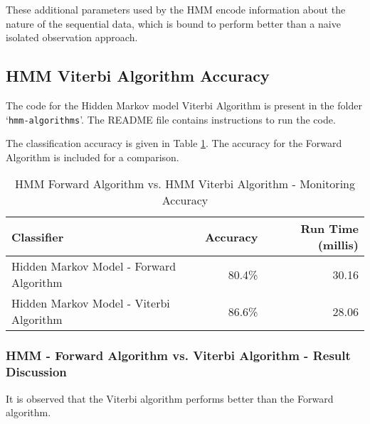 \documentclass[parskip=half]{scrartcl}
\begin{document}
            These additional parameters used by the HMM encode information about the nature of the sequential data, which is bound to perform better than a naive isolated observation approach.
        



    \subsection{HMM Viterbi Algorithm Accuracy} %
    \label{sub:hmm_viterbi_algorithm_accuracy}

        The code for the Hidden Markov model Viterbi Algorithm is present in the folder `\texttt{hmm-algorithms}'. The README file contains instructions to run the code.

        The classification accuracy is given in Table \ref{tab:hmm-forward-vs-hmm-viterbi-accuracy}. The accuracy for the Forward Algorithm is included for a comparison.

        \begin{table}[ht]
            \centering
            \begin{tabular}{| l | r | r |}
            \hline
            \textbf{Classifier} & \textbf{Accuracy} & \textbf{Run Time (millis)} \\
            \hline
            \hline
                Hidden Markov Model - Forward Algorithm & 80.4\% & 30.16\\
            \hline
                Hidden Markov Model - Viterbi Algorithm & 86.6\% & 28.06 \\
            \hline
            \end{tabular}
            \caption{HMM Forward Algorithm vs. HMM Viterbi Algorithm - Monitoring Accuracy}
            \label{tab:hmm-forward-vs-hmm-viterbi-accuracy}
        \end{table}

        \subsubsection*{HMM - Forward Algorithm vs. Viterbi Algorithm - Result Discussion} %
        \label{ssub:hmm_forward_algo_vs_viterbi_algo_discuss}

            It is observed that the Viterbi algorithm performs better than the Forward algorithm.
\end{document}
